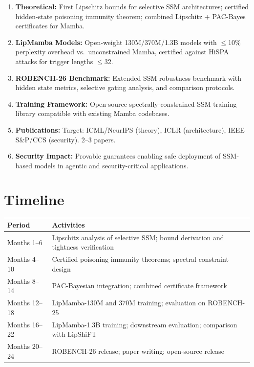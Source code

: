 \documentclass[12pt,a4paper]{article}
\begin{document}
\begin{enumerate}
    \item \textbf{Theoretical:} First Lipschitz bounds for selective SSM architectures; certified hidden-state poisoning immunity theorem; combined Lipschitz + PAC-Bayes certificates for Mamba.
    
    \item \textbf{LipMamba Models:} Open-weight 130M/370M/1.3B models with $\leq$10\% perplexity overhead vs.\ unconstrained Mamba, certified against HiSPA attacks for trigger lengths $\leq$32.
    
    \item \textbf{ROBENCH-26 Benchmark:} Extended SSM robustness benchmark with hidden state metrics, selective gating analysis, and comparison protocols.
    
    \item \textbf{Training Framework:} Open-source spectrally-constrained SSM training library compatible with existing Mamba codebases.
    
    \item \textbf{Publications:} Target: ICML/NeurIPS (theory), ICLR (architecture), IEEE S\&P/CCS (security). 2--3 papers.
    
    \item \textbf{Security Impact:} Provable guarantees enabling safe deployment of SSM-based models in agentic and security-critical applications.
\end{enumerate}

\section{Timeline}

\begin{table}[H]
\centering
\begin{tabularx}{\textwidth}{@{}lX@{}}
\toprule
\textbf{Period} & \textbf{Activities} \\
\midrule
Months 1--6 & Lipschitz analysis of selective SSM; bound derivation and tightness verification \\
Months 4--10 & Certified poisoning immunity theorems; spectral constraint design \\
Months 8--14 & PAC-Bayesian integration; combined certificate framework \\
Months 12--18 & LipMamba-130M and 370M training; evaluation on ROBENCH-25 \\
Months 16--22 & LipMamba-1.3B training; downstream evaluation; comparison with LipShiFT \\
Months 20--24 & ROBENCH-26 release; paper writing; open-source release \\
\bottomrule
\end{tabularx}
\end{table}
\end{document}
